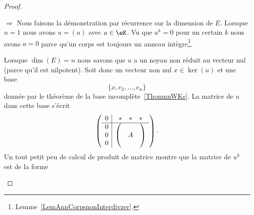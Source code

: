 \begin{proof}
    \begin{subproof}
       \item[\( \Rightarrow\)]
           Nous faisons la démonstration par récurrence sur la dimension de \( E\). Lorsque \( n=1\) nous avons \( u=(a)\) avec \( a\in \eK\). Vu que \( a^k=0\) pour un certain \( k\) nous avons \( a=0\) parce qu'un corps est toujours un anneau intègre\footnote{Lemme~\ref{LemAnnCorpsnonInterdivzer}.}.

           Lorsque \( \dim(E)=n\) nous savons que \( u\) a un noyau non réduit au vecteur nul (parce qu'il est nilpotent). Soit donc un vecteur non nul \( x\in\ker(u)\) et une base
           \begin{equation}
               \{ x,e_2,\ldots, e_n \}
           \end{equation}
           donnée par le théorème de la base incomplète~\ref{ThonmnWKs}. La matrice de \( u\) dans cette base s'écrit
           \begin{equation}
               \begin{pmatrix}
                       \begin{array}[]{c|c}
                           0&\begin{matrix}
                               * &   *    &   *
                           \end{matrix}\\
                           \hline
                           \begin{matrix}
                               0 \\
                               0 \\
                               0
                           \end{matrix}&
                           \begin{pmatrix}
                                &       &       \\
                                &   A    &       \\
                                &       &
                           \end{pmatrix}
                       \end{array}
               \end{pmatrix}.
           \end{equation}
           Un tout petit peu de calcul de produit de matrice montre que la matrice de \( u^k\) est de la forme
           \begin{equation}

\end{equation}
\end{subproof}
\end{proof}
